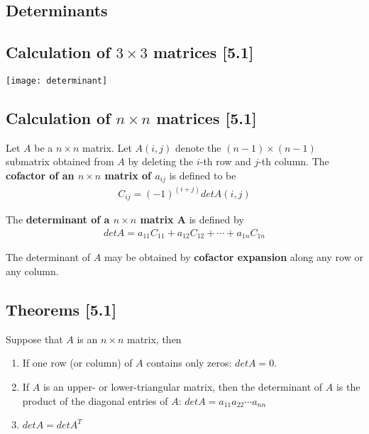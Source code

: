 \documentclass[a4paper,9pt]{extarticle}
\begin{document}
\begin{multicols*}{2}

\section{Determinants}


\subsection{Calculation of $3 \times 3$ matrices [5.1]}
{\centering \texttt{[image: determinant]} \par}


\subsection{Calculation of $n \times n$ matrices [5.1]}
Let $A$ be a $n \times n$ matrix. Let $A(i,j)$ denote the $(n - 1) \times (n - 1)$ submatrix obtained from $A$ by deleting the $i$-th row and $j$-th column. The \textbf{cofactor of an $n \times n$ matrix of $a_{ij}$} is defined to be
\begin{equation} \label{5.1-1}
    \begin{split}
        C_{ij} = (-1)^{(i + j)} det A(i, j)
    \end{split}
\end{equation}

The \textbf{determinant of a $n \times n$ matrix A} is defined by
\begin{equation} \label{5.1-2}
    \begin{split}
        det A = a_{11} C_{11} + a_{12} C_{12} + \cdots + a_{1n} C_{1n}
    \end{split}
\end{equation}

The determinant of $A$ may be obtained by \textbf{cofactor expansion} along any row or any column.


\subsection{Theorems [5.1]}
Suppose that $A$ is an $n \times n$ matrix, then
\begin{enumerate}[label=\bfseries (\arabic*)] \itemsep0pt \parskip0pt 
    \item If one row (or column) of $A$ contains only zeros: $det A = 0$.
    \item If $A$ is an upper- or lower-triangular matrix, then the determinant of $A$ is the product of the diagonal entries of $A$: $det A = a_{11} a_{22} \cdots a_{nn}$
    \item $det A = det A^T$
\end{enumerate}


\end{multicols*}
\end{document}
